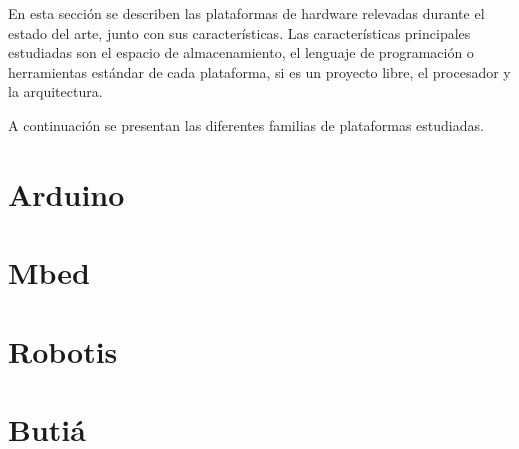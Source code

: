 
  En esta sección se describen las plataformas de hardware relevadas
durante el estado del arte, junto con sus características.
  Las características principales estudiadas 
  son el espacio de almacenamiento,
el lenguaje de programación o herramientas estándar de cada
plataforma, si es un proyecto libre, el procesador y la arquitectura.

  A continuación se presentan las diferentes familias de plataformas
estudiadas.%



\section{Arduino}


\section{Mbed}


\section{Robotis}


%

%

\section{Butiá}


%

